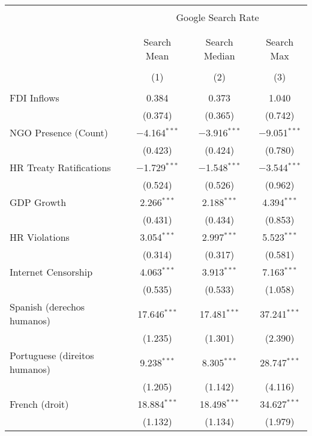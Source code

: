 
\begin{table}[!htbp] \centering 
  \caption{} 
  \label{} 
\begin{tabular}{@{\extracolsep{5pt}}lccc} 
\\[-1.8ex]\hline 
\hline \\[-1.8ex] 
 & \multicolumn{3}{c}{Google Search Rate} \\ 
\cline{2-4} 
\\[-1.8ex] & \multicolumn{3}{c}{ } \\ 
 & Search Mean & Search Median & Search Max \\ 
\\[-1.8ex] & (1) & (2) & (3)\\ 
\hline \\[-1.8ex] 
 FDI Inflows & 0.384 & 0.373 & 1.040 \\ 
  & (0.374) & (0.365) & (0.742) \\ 
  NGO Presence (Count) & $-$4.164$^{***}$ & $-$3.916$^{***}$ & $-$9.051$^{***}$ \\ 
  & (0.423) & (0.424) & (0.780) \\ 
  HR Treaty Ratifications & $-$1.729$^{***}$ & $-$1.548$^{***}$ & $-$3.544$^{***}$ \\ 
  & (0.524) & (0.526) & (0.962) \\ 
  GDP Growth & 2.266$^{***}$ & 2.188$^{***}$ & 4.394$^{***}$ \\ 
  & (0.431) & (0.434) & (0.853) \\ 
  HR Violations & 3.054$^{***}$ & 2.997$^{***}$ & 5.523$^{***}$ \\ 
  & (0.314) & (0.317) & (0.581) \\ 
  Internet Censorship & 4.063$^{***}$ & 3.913$^{***}$ & 7.163$^{***}$ \\ 
  & (0.535) & (0.533) & (1.058) \\ 
  Spanish (derechos humanos) & 17.646$^{***}$ & 17.481$^{***}$ & 37.241$^{***}$ \\ 
  & (1.235) & (1.301) & (2.390) \\ 
  Portuguese (direitos humanos) & 9.238$^{***}$ & 8.305$^{***}$ & 28.747$^{***}$ \\ 
  & (1.205) & (1.142) & (4.116) \\ 
  French (droit) & 18.884$^{***}$ & 18.498$^{***}$ & 34.627$^{***}$ \\ 
  & (1.132) & (1.134) & (1.979) \\ 

\end{tabular}
\end{table}
